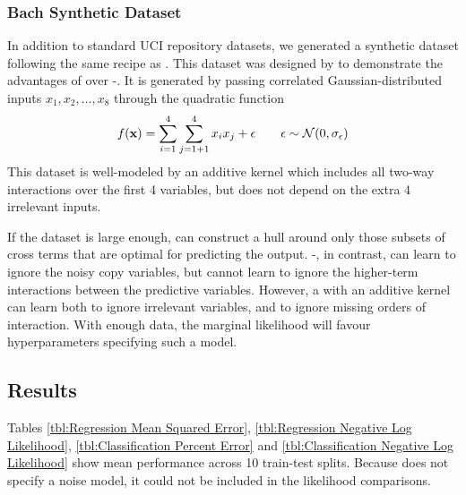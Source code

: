 \subsubsection{Bach Synthetic Dataset}
In addition to standard UCI repository datasets, we generated a synthetic dataset following the same recipe as \citet{DBLP:journals/corr/abs-0909-0844}.
This dataset was designed by \citet{DBLP:journals/corr/abs-0909-0844} to demonstrate the advantages of \HKL{} over \gp{}-\ARD{}.
It is generated by passing correlated Gaussian-distributed inputs $x_1, x_2, \dots, x_8$ through the quadratic function
%
\begin{align}
f({\bf{x}}) = \sum_{i=1}^4 \sum_{j=1+1}^4 x_i x_j + \epsilon \qquad    \epsilon \sim \mathcal{N}\!\left(0,\sigma_\epsilon\right)
\end{align}
%
This dataset is well-modeled by an additive kernel which includes all two-way interactions over the first 4 variables, but does not depend on the extra 4 irrelevant inputs.%

If the dataset is large enough, \HKL{} can construct a hull around only those subsets of cross terms that are optimal for predicting the output.
\gp{}-\ARD{}, in contrast, can learn to ignore the noisy copy variables, but cannot learn to ignore the higher-term interactions between the predictive variables.
However, a \gp{} with an additive kernel can learn both to ignore irrelevant variables, and to ignore missing orders of interaction.
With enough data, the marginal likelihood will favour hyperparameters specifying such a model.
 
 
\subsection{Results}
Tables \ref{tbl:Regression Mean Squared Error}, \ref{tbl:Regression Negative Log Likelihood}, \ref{tbl:Classification Percent Error} and \ref{tbl:Classification Negative Log Likelihood} show mean performance across 10 train-test splits.
Because \HKL{} does not specify a noise model, it could not be included in the likelihood comparisons.

